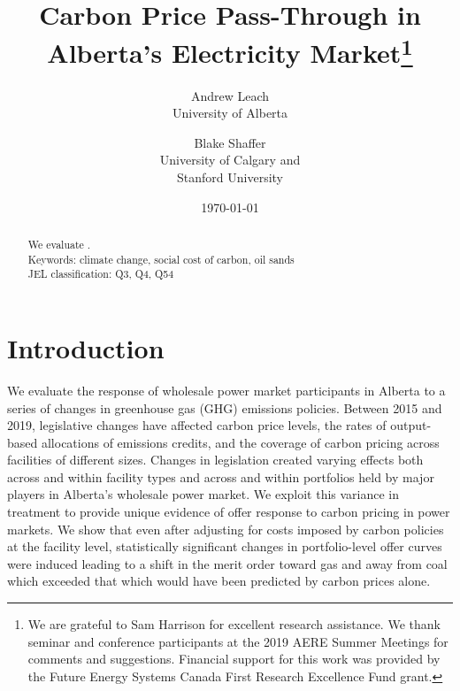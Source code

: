 \documentclass[12pt]{article}
\title{Carbon Price Pass-Through in Alberta's Electricity Market\thanks{We are grateful to Sam Harrison for excellent
research assistance. We thank seminar and conference participants at the 2019 AERE Summer Meetings for comments and suggestions. Financial support for this work was provided by the Future Energy Systems Canada First Research Excellence Fund grant.
}
}
\date{\today}
\author{Andrew Leach\\
 University of Alberta
 \and
Blake Shaffer\\University of Calgary and\\Stanford University
}
\begin{document}
\maketitle

\begin{abstract}
\noindent We evaluate .\\
\vspace{0.2in}
\noindent Keywords: climate change, social cost of carbon, oil sands\\
JEL classification: Q3, Q4, Q54
\end{abstract}

\thispagestyle{empty}
\newpage
\onehalfspacing


\section{Introduction}

We evaluate the response of wholesale power market participants in Alberta to a series of changes in greenhouse gas (GHG) emissions policies.  Between 2015 and 2019, legislative changes have affected carbon price levels, the rates of output-based allocations of emissions credits, and the coverage of carbon pricing across facilities of different sizes.  Changes in legislation created varying effects both across and within facility types and across and within portfolios held by major players in Alberta's wholesale power market. We exploit this variance in treatment to provide unique evidence of offer response to carbon pricing in power markets. We show that even after adjusting for costs imposed by carbon policies at the facility level, statistically significant changes in portfolio-level offer curves were induced leading to a shift in the merit order toward gas and away from coal which exceeded that which would have been predicted by carbon prices alone.
\end{document}
